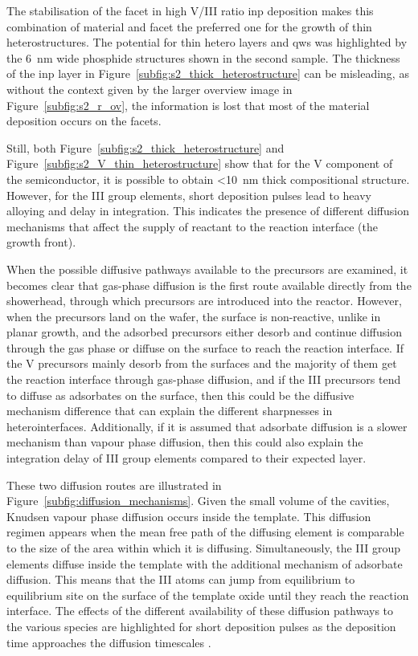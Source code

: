 The stabilisation of the  facet in high V/III ratio \acs{inp} deposition makes this combination of material and facet the preferred one for the growth of thin heterostructures. The potential for thin hetero layers and \acl{qw}s was highlighted by the \qty{6}{\nano\metre} wide phosphide structures shown in the second sample. The thickness of the \acs{inp} layer in Figure~\ref{subfig:s2_thick_heterostructure} can be misleading, as without the context given by the larger overview image in Figure~\ref{subfig:s2_r_ov}, the information is lost that most of the material deposition occurs on the  facets. 

Still, both Figure~\ref{subfig:s2_thick_heterostructure} and Figure~\ref{subfig:s2_V_thin_heterostructure} show that for the V component of the semiconductor, it is possible to obtain <\qty{10}{\nano\metre} thick compositional structure. However, for the III group elements, short deposition pulses lead to heavy alloying and delay in integration. This indicates the presence of different diffusion mechanisms that affect the supply of reactant to the reaction interface (the growth front). 

When the possible diffusive pathways available to the precursors are examined, it becomes clear that gas-phase diffusion is the first route available directly from the showerhead, through which precursors are introduced into the reactor. However, when the precursors land on the wafer, the surface is non-reactive, unlike in planar growth, and the adsorbed precursors either desorb and continue diffusion through the gas phase or diffuse on the surface to reach the reaction interface. If the V precursors mainly desorb from the surfaces and the majority of them get the reaction interface through gas-phase diffusion, and if the III precursors tend to diffuse as adsorbates on the surface, then this could be the diffusive mechanism difference that can explain the different sharpnesses in heterointerfaces. Additionally, if it is assumed that adsorbate diffusion is a slower mechanism than vapour phase diffusion, then this could also explain the integration delay of III group elements compared to their expected layer. 

These two diffusion routes are illustrated in Figure~\ref{subfig:diffusion_mechanisms}. Given the small volume of the cavities, Knudsen vapour phase diffusion occurs inside the template. This diffusion regimen appears when the mean free path of the diffusing element is comparable to the size of the area within which it is diffusing. Simultaneously, the III group elements diffuse inside the template with the additional mechanism of adsorbate diffusion. This means that the III atoms can jump from equilibrium to equilibrium site on the surface of the template oxide until they reach the reaction interface. The effects of the different availability of these diffusion pathways to the various species are highlighted for short deposition pulses as the deposition time approaches the diffusion timescales \cite{Brugnolotto2023}.

